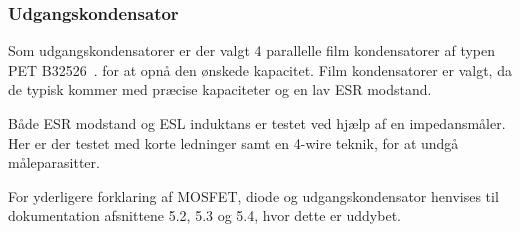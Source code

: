 \subsubsection{Udgangskondensator}
Som udgangskondensatorer er der valgt 4 parallelle film kondensatorer af typen PET B32526~\cite{Kondensator}. for at opnå den ønskede kapacitet. Film kondensatorer er valgt, da de typisk kommer med præcise kapaciteter og en lav ESR modstand.

Både ESR modstand og ESL induktans er testet ved hjælp af en impedansmåler. Her er der testet med korte ledninger samt en 4-wire teknik, for at undgå måleparasitter.

For yderligere forklaring af MOSFET, diode og udgangskondensator henvises til dokumentation afsnittene 5.2, 5.3 og 5.4, hvor dette er uddybet.